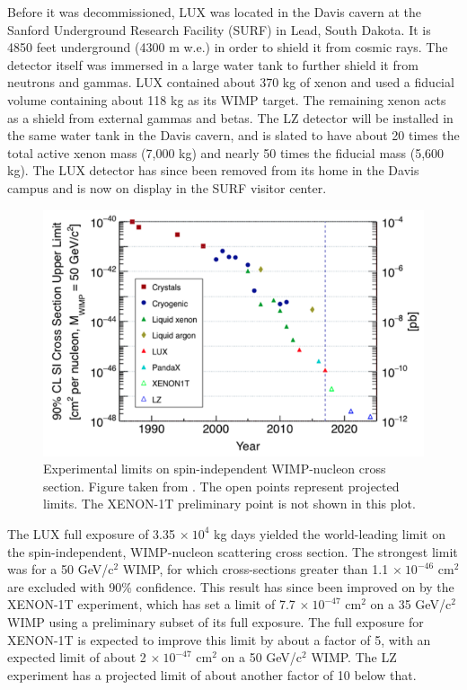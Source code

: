 Before it was decommissioned, LUX was located in the Davis cavern at the Sanford Underground Research Facility (SURF) in Lead, South Dakota. It is 4850 feet underground (4300 m w.e.) in order to shield it from cosmic rays. The detector itself was immersed in a large water tank to further shield it from neutrons and gammas. LUX contained about 370 kg of xenon and used a fiducial volume containing about 118 kg as its WIMP target. The remaining xenon acts as a shield from external gammas and betas. The LZ detector will be installed in the same water tank in the Davis cavern, and is slated to have about 20 times the total active xenon mass (7,000 kg) and nearly 50 times the fiducial mass (5,600 kg). The LUX detector has since been removed from its home in the Davis campus and is now on display in the SURF visitor center. 
\begin{figure}[h!]
\centering
\includegraphics[width=\linewidth]{Figures/limits_trend.png}
\caption{Experimental limits on spin-independent WIMP-nucleon cross section. Figure taken from \cite{lz_tdr}. The open points represent projected limits. The XENON-1T preliminary point is not shown in this plot.}
\label{fig:limits_trend} 
\end{figure}

The LUX full exposure of 3.35 $\times \ 10^4$ kg days yielded the world-leading limit on the spin-independent, WIMP-nucleon scattering cross section. The strongest limit was for a 50 GeV/c$^2$ WIMP, for which cross-sections greater than 1.1 $\times \ 10^{-46}$ cm$^2$ are excluded with 90\% confidence. This result has since been improved on by the XENON-1T experiment, which has set a limit of 7.7 $\times \ 10^{-47}$ cm$^2$ on a 35 GeV/c$^2$ WIMP using a preliminary subset of its full exposure. The full exposure for XENON-1T is expected to improve this limit by about a factor of 5, with an expected limit of about 2 $\times \ 10^{-47}$ cm$^2$ on a 50 GeV/c$^2$ WIMP. The LZ experiment has a projected limit of about another factor of 10 below that.


